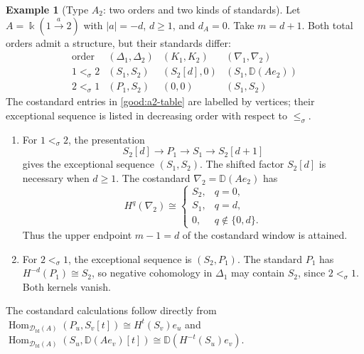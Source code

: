 \documentclass[11pt,a4paper]{article}
\newcommand{\D}{\mathcal D}
\newcommand{\std}{\Delta}
\newcommand{\costd}{\nabla}
\newcommand{\dual}{\mathbb D}
\DeclareMathOperator{\fd}{fd}
\DeclareMathOperator{\Hom}{Hom}
\theoremstyle{plain}
\theoremstyle{definition}
\newtheorem{example}[theorem]{Example}
\numberwithin{equation}{section}
\begin{document}
\begin{example}[Type $A_2$: two orders and two kinds of standards]
\label{good:a2}
Let $A=\Bbbk(1\xrightarrow{a}2)$ with $|a|=-d$, $d\geq1$, and
$d_A=0$. Take $m=d+1$.
Both total orders admit a structure, but their standards differ:
\begin{equation}\label{good:a2-table}
 \begin{array}{c|c|c|c}
 \text{order}&(\std_1,\std_2)&(K_1,K_2)&(\costd_1,\costd_2)\\\hline
 1<_\sigma2&(S_1,S_2)&(S_2[d],0)&(S_1,\dual(Ae_2))\\
 2<_\sigma1&(P_1,S_2)&(0,0)&(S_1,S_2)
 \end{array}
\end{equation}
The costandard entries in \eqref{good:a2-table} are labelled by
vertices; their exceptional sequence is listed in decreasing
order with respect to $\leq_\sigma$.
\begin{enumerate}
 \item For $1<_\sigma2$, the presentation
 \[
  S_2[d]\longrightarrow P_1\longrightarrow S_1
  \longrightarrow S_2[d+1]
 \]
 gives the exceptional sequence $(S_1,S_2)$.
 The shifted factor $S_2[d]$ is necessary when $d\geq1$.
 The costandard $\costd_2=\dual(Ae_2)$ has
 \[
 H^q(\costd_2)\cong
 \begin{cases}S_2,&q=0,\\S_1,&q=d,\\0,&q\notin\{0,d\}.
 \end{cases}
 \]
 Thus the upper endpoint $m-1=d$ of the costandard window is
 attained.
 \item For $2<_\sigma1$, the exceptional sequence is $(S_2,P_1)$.
 The standard $P_1$ has $H^{-d}(P_1)\cong S_2$, so negative
 cohomology in $\std_1$ may contain $S_2$, since $2<_\sigma1$.
 Both kernels vanish.
\end{enumerate}
The costandard calculations follow directly from
$\Hom_{\D_{\fd}(A)}(P_u,S_v[t])\cong H^t(S_v)e_u$ and
$\Hom_{\D_{\fd}(A)}(S_u,\dual(Ae_v)[t])
\cong\dual(H^{-t}(S_u)e_v)$.
\end{example}
\end{document}
